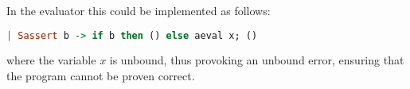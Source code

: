 In the evaluator this could be implemented as follows:
\begin{lstlisting}[language=haskell]
| Sassert b -> if b then () else aeval x; ()
\end{lstlisting}
where the variable $x$ is unbound, thus provoking an unbound error, ensuring that the program
cannot be proven correct.



